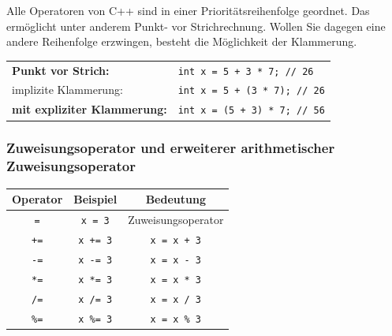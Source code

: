 \documentclass[a4paper]{report}
\begin{document}
Alle Operatoren von C++ sind in einer Prioritätsreihenfolge geordnet. Das ermöglicht unter anderem Punkt- vor Strichrechnung. Wollen Sie dagegen eine andere Reihenfolge erzwingen, besteht die Möglichkeit der Klammerung.
\begin{center}
	\begin{tabular}{|l|l|} \hline
		\textbf{Punkt vor Strich:} & \texttt{int x = 5 + 3 * 7; // 26} \\
		\quad implizite Klammerung: & \texttt{int x = 5 + (3 * 7); // 26} \\ \hline
		\textbf{mit expliziter Klammerung:} & \texttt{int x = (5 + 3) * 7; // 56} \\ \hline
	\end{tabular}
\end{center}

\subsubsection{Zuweisungsoperator und erweiterer arithmetischer Zuweisungsoperator}
\begin{center}
	\begin{tabular}{|c|c|c|} \hline
		\textbf{Operator} &	\textbf{Beispiel} & \textbf{Bedeutung} \\ \hline
		\texttt{=} & \texttt{x = 3} & Zuweisungsoperator \\ \hline
		\texttt{+=} & \texttt{x += 3} & \texttt{x = x + 3} \\ \hline
		\texttt{-=} & \texttt{x -= 3} & \texttt{x = x - 3} \\ \hline
		\texttt{*=} & \texttt{x *= 3} & \texttt{x = x * 3} \\ \hline
		\texttt{/=} & \texttt{x /= 3} & \texttt{x = x / 3} \\ \hline
		\texttt{\%=} & \texttt{x \%= 3} & \texttt{x = x \% 3} \\ \hline	

	\end{tabular}
\end{center}


\end{document}
